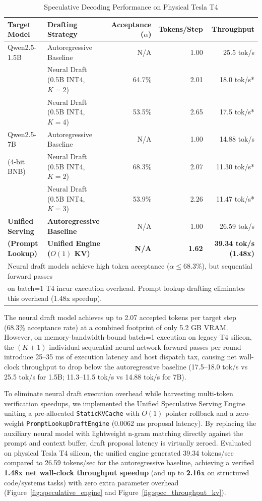 \documentclass[10pt,twocolumn,letterpaper]{article}
\begin{document}
\begin{table}[h]
\centering
\caption{Speculative Decoding Performance on Physical Tesla T4}
\label{tab:spec_eval}
\small
\begin{tabular}{llrrr}
\toprule
Target Model & Drafting Strategy & Acceptance ($\alpha$) & Tokens/Step & Throughput \\
\midrule
Qwen2.5-1.5B & Autoregressive Baseline & N/A    & 1.00 & 25.5 tok/s \\
             & Neural Draft (0.5B INT4, $K=2$) & 64.7\% & 2.01 & 18.0 tok/s* \\
             & Neural Draft (0.5B INT4, $K=4$) & 53.5\% & 2.65 & 17.5 tok/s* \\
\midrule
Qwen2.5-7B   & Autoregressive Baseline & N/A    & 1.00 & 14.88 tok/s \\
(4-bit BNB)  & Neural Draft (0.5B INT4, $K=2$) & 68.3\% & 2.07 & 11.30 tok/s* \\
             & Neural Draft (0.5B INT4, $K=3$) & 53.9\% & 2.26 & 11.47 tok/s* \\
\midrule
\textbf{Unified Serving} & \textbf{Autoregressive Baseline} & N/A & 1.00 & 26.59 tok/s \\
\textbf{(Prompt Lookup)} & \textbf{Unified Engine ($O(1)$ KV)} & \textbf{N/A} & \textbf{1.62} & \textbf{39.34 tok/s (1.48x)} \\
\bottomrule
\multicolumn{5}{l}{\footnotesize *Neural draft models achieve high token acceptance ($\alpha \le 68.3\%$), but sequential forward passes} \\
\multicolumn{5}{l}{\footnotesize on batch=1 T4 incur execution overhead. Prompt lookup drafting eliminates this overhead (1.48x speedup).}
\end{tabular}
\end{table}

The neural draft model achieves up to 2.07 accepted tokens per target step (68.3\% acceptance rate) at a combined footprint of only 5.2 GB VRAM. However, on memory-bandwidth-bound batch=1 execution on legacy T4 silicon, the $(K+1)$ individual sequential neural network forward passes per round introduce 25--35 ms of execution latency and host dispatch tax, causing net wall-clock throughput to drop below the autoregressive baseline (17.5--18.0 tok/s vs 25.5 tok/s for 1.5B; 11.3--11.5 tok/s vs 14.88 tok/s for 7B).

To eliminate neural draft execution overhead while harvesting multi-token verification speedups, we implemented the Unified Speculative Serving Engine uniting a pre-allocated \texttt{StaticKVCache} with $O(1)$ pointer rollback and a zero-weight \texttt{PromptLookupDraftEngine} (0.0062 ms proposal latency). By replacing the auxiliary neural model with lightweight n-gram matching directly against the prompt and context buffer, draft proposal latency is virtually zeroed. Evaluated on physical Tesla T4 silicon, the unified engine generated 39.34 tokens/sec compared to 26.59 tokens/sec for the autoregressive baseline, achieving a verified \textbf{1.48x net wall-clock throughput speedup} (and up to \textbf{2.16x} on structured code/systems tasks) with zero extra parameter overhead (Figure~\ref{fig:speculative_engine} and Figure~\ref{fig:spec_throughput_kv}).
\end{document}
